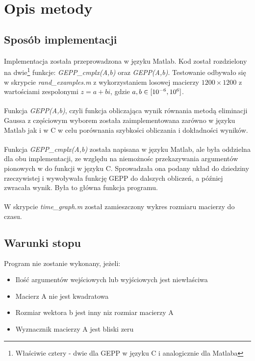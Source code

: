 \documentclass[12pt, flegn, leqno]{article}
\begin{document}
    \section{Opis metody}
        \subsection*{Sposób implementacji}
            \paragraph{}
            Implementacja została przeprowadzona w języku Matlab.
            Kod został rozdzielony na 
            dwie\footnote{Właściwie cztery - dwie dla GEPP w języku C i analogicznie dla Matlaba}
            funkcje: \textit{GEPP\_cmplx(A,b)} oraz \textit{GEPP(A,b)}.
            Testowanie odbywało się w skrypcie \textit{rand\_examples.m} z wykorzystaniem losowej macierzy 
            $1200 \times 1200$ z wartościami zespolonymi $z = a + bi$, 
            gdzie $a,b \in \interval{10^{-6}}{10^{6}}$. 
            \paragraph{}
            Funkcja \textit{GEPP(A,b)}, czyli funkcja obliczająca wynik równania metodą eliminacji
            Gaussa z częściowym wyborem została zaimplementowana zarówno w języku Matlab jak i 
            w C w celu porównania szybkości obliczania i dokładności wyników.
            \paragraph{}
            Funkcja \textit{GEPP\_cmplx(A,b)} została napisana w języku Matlab, ale była
            oddzielna dla obu implementacji, ze względu na niemożnośc przekazywania argumentów pionowych 
            w do funkcji w języku C. Sprowadzała ona podany układ do dziedziny rzeczywistej i wywoływała 
            funkcję GEPP do dalszych obliczeń, a później zwracała wynik.
            Była to główna funkcja programu.
            \paragraph{}
            W skrypcie \textit{time\_graph.m} został zamieszczony wykres rozmiaru macierzy do
            czasu.


        \subsection*{Warunki stopu}
            Program nie zostanie wykonany, jeżeli:
            \begin{itemize}
                \item{Ilość argumentów wejściowych lub wyjściowych jest niewłaściwa}
                \item{Macierz A nie jest kwadratowa}
                \item{Rozmiar wektora b jest inny niz rozmiar macierzy A}
                \item{Wyznacznik macierzy A jest bliski zeru}
            \end{itemize}
\end{document}
